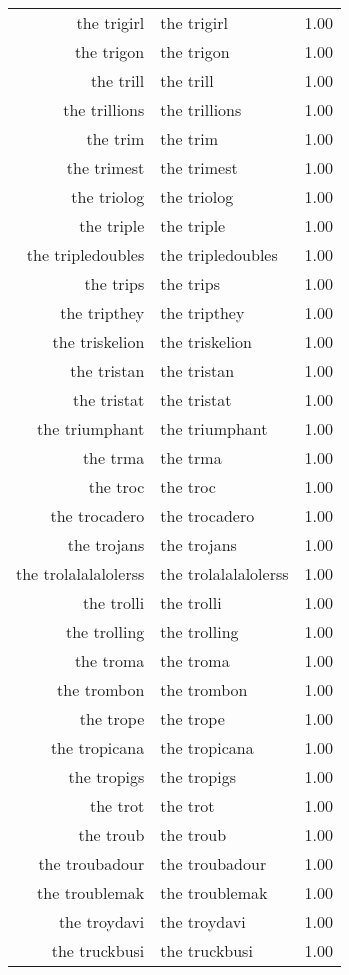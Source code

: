 \begin{table}[ht]
\begin{tabular}{rlr}
  the trigirl & the trigirl & 1.00 \\ 
  the trigon & the trigon & 1.00 \\ 
  the trill & the trill & 1.00 \\ 
  the trillions & the trillions & 1.00 \\ 
  the trim & the trim & 1.00 \\ 
  the trimest & the trimest & 1.00 \\ 
  the triolog & the triolog & 1.00 \\ 
  the triple & the triple & 1.00 \\ 
  the tripledoubles & the tripledoubles & 1.00 \\ 
  the trips & the trips & 1.00 \\ 
  the tripthey & the tripthey & 1.00 \\ 
  the triskelion & the triskelion & 1.00 \\ 
  the tristan & the tristan & 1.00 \\ 
  the tristat & the tristat & 1.00 \\ 
  the triumphant & the triumphant & 1.00 \\ 
  the trma & the trma & 1.00 \\ 
  the troc & the troc & 1.00 \\ 
  the trocadero & the trocadero & 1.00 \\ 
  the trojans & the trojans & 1.00 \\ 
  the trolalalalolerss & the trolalalalolerss & 1.00 \\ 
  the trolli & the trolli & 1.00 \\ 
  the trolling & the trolling & 1.00 \\ 
  the troma & the troma & 1.00 \\ 
  the trombon & the trombon & 1.00 \\ 
  the trope & the trope & 1.00 \\ 
  the tropicana & the tropicana & 1.00 \\ 
  the tropigs & the tropigs & 1.00 \\ 
  the trot & the trot & 1.00 \\ 
  the troub & the troub & 1.00 \\ 
  the troubadour & the troubadour & 1.00 \\ 
  the troublemak & the troublemak & 1.00 \\ 
  the troydavi & the troydavi & 1.00 \\ 
  the truckbusi & the truckbusi & 1.00 \\ 

\end{tabular}
\end{table}
